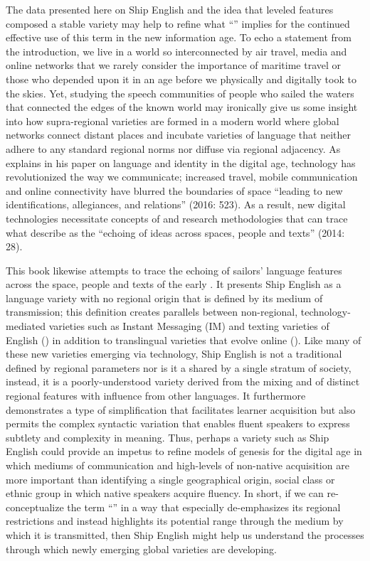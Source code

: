The data presented here on Ship English and the idea that leveled features composed a stable variety may help to refine what “” implies for the continued effective use of this term in the new information age. To echo a statement from the introduction, we live in a world so interconnected by air travel, media and online networks that we rarely consider the importance of maritime travel or those who depended upon it in an age before we physically and digitally took to the skies. Yet, studying the speech communities of people who sailed the waters that connected the edges of the known world may ironically give us some insight into how supra-regional varieties are formed in a modern world where global networks connect distant places and incubate varieties of language that neither adhere to any standard regional norms nor diffuse via regional adjacency. As \citeauthor{Darvin2016} explains in his paper on language and identity in the digital age, technology has revolutionized the way we communicate; increased travel, mobile communication and online connectivity have blurred the boundaries of space “leading to new identifications, allegiances, and relations” (2016: 523). As a result, new digital technologies necessitate concepts of  and research methodologies that can trace what \citeauthor{StornaiuoloHall} describe as the “echoing of ideas across spaces, people and texts” (2014: 28). 

This book likewise attempts to trace the echoing of sailors’ language features across the space, people and texts of the early . It presents Ship English as a language variety with no regional origin that is defined by its medium of transmission; this definition creates parallels between non-regional, technology-mediated varieties such as Instant Messaging (IM) and texting varieties of English (\citealt{WarschauerMatuchniak2010}) in addition to translingual varieties that evolve online (\citealt{Canagarajah2013}).  Like many of these new varieties emerging via technology, Ship English is not a traditional  defined by regional parameters nor is it a  shared by a single stratum of society, instead, it is a poorly-understood variety derived from the mixing and  of distinct regional features with influence from other languages. It furthermore demonstrates a type of simplification that facilitates learner acquisition but also permits the complex syntactic variation that enables fluent speakers to express subtlety and complexity in meaning. Thus, perhaps a variety such as Ship English could provide an impetus to refine models of  genesis for the digital age in which mediums of communication and high-levels of non-native acquisition are more important than identifying a single geographical origin, social class or ethnic group in which native speakers acquire fluency. In short, if we can re-conceptualize the term “” in a way that especially de-emphasizes its regional restrictions and instead highlights its potential range through the medium by which it is transmitted, then Ship English might help us understand the processes through which newly emerging global varieties are developing. 

